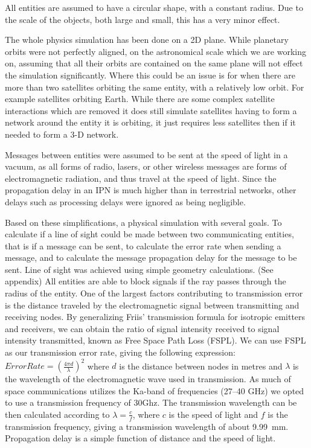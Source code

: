 \documentclass[a4paper,12pt]{article}
\begin{document}
All entities are assumed to have a circular shape, with a constant radius. Due
to the scale of the objects, both large and small, this has a very minor effect.

The whole physics simulation has been done on a 2D plane. While planetary orbits
were not perfectly aligned, on the astronomical scale which we are working on,
assuming that all their orbits are contained on the same plane will not effect
the simulation significantly. Where this could be an issue is for when there are
more than two satellites orbiting the same entity, with a relatively low orbit.
For example satellites orbiting Earth. While there are some complex satellite
interactions which are removed it does still simulate satellites having to form
a network around the entity it is orbiting, it just requires less satellites
then if it needed to form a 3-D network.

Messages between entities were assumed to be sent at the speed of light in a
vacuum, as all forms of radio, lasers, or other wireless messages are forms of
electromagnetic radiation, and thus travel at the speed of light. Since the
propagation delay in an IPN is much higher than in terrestrial networks, other
delays such as processing delays were ignored as being negligible.

Based on these simplifications, a physical simulation with several goals. To
calculate if a line of sight could be made between two communicating entities,
that is if a message can be sent, to calculate the error rate when sending a
message, and to calculate the message propagation delay for the message to be
sent. Line of sight was achieved using simple geometry calculations. (See
appendix) All entities are able to block signals if the ray passes through the
radius of the entity. One of the largest factors contributing to transmission
error is the distance traveled by the electromagnetic signal between
transmitting and receiving nodes. By generalizing Friis' transmission
formula\cite{Friis} for isotropic emitters and receivers, we can obtain the
ratio of signal intensity received to signal intensity transmitted, known as
Free Space Path Loss (FSPL). We can use FSPL as our transmission error rate,
giving the following expression: $Error Rate = {(\frac{4 \pi d}{\lambda})}^2$
where $d$ is the distance between nodes in metres and $\lambda$ is the
wavelength of the electromagnetic wave used in transmission. As much of space
communications utilizes the Ka-band of frequencies (27--40
GHz)\cite{Morabito_Hastrup} we opted to use a transmission frequency of 30Ghz.
The transmission wavelength can be then calculated according to
$\lambda = \frac{c}{f}$, where $c$ is the speed of light and $f$ is the
transmission frequency, giving a transmission wavelength of about 9.99~mm.
Propagation delay is a simple function of distance and the speed of light.
\end{document}
